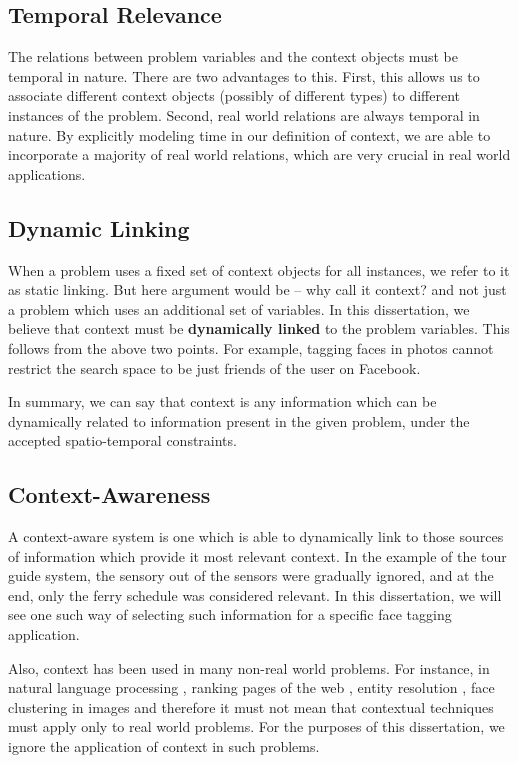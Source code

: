 \subsection{Temporal Relevance}
The relations between problem variables and the context objects must be temporal in nature. There are two advantages to this. First, this allows us to associate different context objects (possibly of different types) to different instances of the problem. Second, real world relations are always temporal in nature. By explicitly modeling time in our definition of context, we are able to incorporate a majority of real world relations, which are very crucial in real world applications.

\subsection{Dynamic Linking}
When a problem uses a fixed set of context objects for all instances, we refer to it as static linking. But here argument would be -- why call it context? and not just a problem which uses an additional set of variables. In this dissertation, we believe that context must be \textbf{dynamically linked} to the problem variables. This follows from the above two points. For example, tagging faces in photos cannot restrict the search space to be just friends of the user on Facebook. 

In summary, we can say that context is any information which can be dynamically related to information present in the given problem, under the accepted spatio-temporal constraints.

\subsection{Context-Awareness}
A context-aware system is one which is able to dynamically link to those sources of information which provide it most relevant context. In the example of the tour guide system, the sensory out of the sensors were gradually ignored, and at the end, only the ferry schedule was considered relevant. In this dissertation, we will see one such way of selecting such information for a specific face tagging application. 

Also, context has been used in many non-real world problems. For instance, in natural language processing \cite{lee1990context}, ranking pages of the web \cite{page1999pagerank}, entity resolution \cite{chen2009exploiting}, face clustering in images \cite{zhang2013unified} and therefore it must not mean that contextual techniques must apply only to real world problems. For the purposes of this dissertation, we ignore the application of context in such problems.

